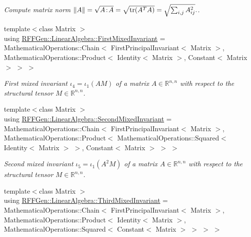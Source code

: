 \begin{DoxyCompactItemize}
\begin{DoxyCompactList}\small\item\em Compute matrix norm $ \|A\| = \sqrt{A\negthinspace : \negthinspace A }= \sqrt{\mathrm{tr}(A^TA)} = \sqrt{\sum_{i,j} A_{ij}^2}. $. \end{DoxyCompactList}\item 
\hypertarget{group__LinearAlgebraGroup_ga9896f1432dd23593f147c31c0be9ccde}{{\footnotesize template$<$class Matrix $>$ }\\using \hyperlink{group__LinearAlgebraGroup_ga9896f1432dd23593f147c31c0be9ccde}{R\-F\-F\-Gen\-::\-Linear\-Algebra\-::\-First\-Mixed\-Invariant} = Mathematical\-Operations\-::\-Chain$<$ First\-Principal\-Invariant$<$ Matrix $>$, Mathematical\-Operations\-::\-Product$<$ Identity$<$ Matrix $>$, Constant$<$ Matrix $>$ $>$ $>$}\label{group__LinearAlgebraGroup_ga9896f1432dd23593f147c31c0be9ccde}

\begin{DoxyCompactList}\small\item\em First mixed invariant $ \iota_4=\iota_1(AM) $ of a matrix $A\in\mathbb{R}^{n,n}$ with respect to the structural tensor $M\in\mathbb{R}^{n,n}$. \end{DoxyCompactList}\item 
\hypertarget{group__LinearAlgebraGroup_ga95c502f232d267e4f199747024152206}{{\footnotesize template$<$class Matrix $>$ }\\using \hyperlink{group__LinearAlgebraGroup_ga95c502f232d267e4f199747024152206}{R\-F\-F\-Gen\-::\-Linear\-Algebra\-::\-Second\-Mixed\-Invariant} = Mathematical\-Operations\-::\-Chain$<$ First\-Principal\-Invariant$<$ Matrix $>$, Mathematical\-Operations\-::\-Product$<$ Mathematical\-Operations\-::\-Squared$<$ Identity$<$ Matrix $>$ $>$, Constant$<$ Matrix $>$ $>$ $>$}\label{group__LinearAlgebraGroup_ga95c502f232d267e4f199747024152206}

\begin{DoxyCompactList}\small\item\em Second mixed invariant $ \iota_5=\iota_1(A^2M) $ of a matrix $A\in\mathbb{R}^{n,n}$ with respect to the structural tensor $M\in\mathbb{R}^{n,n}$. \end{DoxyCompactList}\item 
\hypertarget{group__LinearAlgebraGroup_gab211541411dec582511acf5b0e956864}{{\footnotesize template$<$class Matrix $>$ }\\using \hyperlink{group__LinearAlgebraGroup_gab211541411dec582511acf5b0e956864}{R\-F\-F\-Gen\-::\-Linear\-Algebra\-::\-Third\-Mixed\-Invariant} = Mathematical\-Operations\-::\-Chain$<$ First\-Principal\-Invariant$<$ Matrix $>$, Mathematical\-Operations\-::\-Product$<$ Identity$<$ Matrix $>$, Mathematical\-Operations\-::\-Squared$<$ Constant$<$ Matrix $>$ $>$ $>$ $>$}\label{group__LinearAlgebraGroup_gab211541411dec582511acf5b0e956864}


\end{DoxyCompactItemize}

